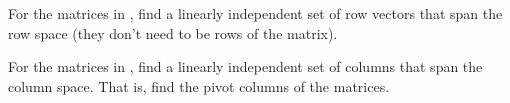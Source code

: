 \documentclass{ximera}
\begin{document}
\begin{exercise}
    For the matrices in , find a linearly independent set of row vectors that span the row space (they don't need to be rows of the matrix).
\end{exercise}

\begin{exercise}
    For the matrices in , find a linearly independent set of columns that span the column space. That is, find the pivot columns of the matrices.
\end{exercise}
\end{document}
